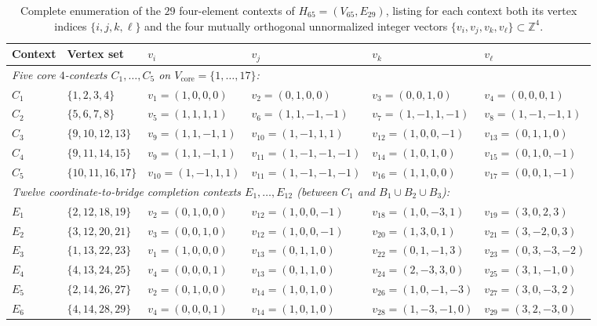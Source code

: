 \documentclass[
  aps,
  pra,
  reprint,
  superscriptaddress,
  amsmath,
  amssymb,
  nofootinbib,
  floatfix
]{revtex4-2}
\theoremstyle{definition}
\theoremstyle{remark}
\begin{document}
\begin{table}[t]
\caption{Complete enumeration of the $29$ four-element contexts of $H_{65}=(V_{65},E_{29})$, listing for each context both its vertex indices $\{i,j,k,\ell\}$ and the four mutually orthogonal unnormalized integer vectors $\{v_i,v_j,v_k,v_\ell\}\subset\mathbb{Z}^4$.}\label{tab:app-h65-contexts}
\scriptsize
\begin{ruledtabular}
\begin{tabular}{llllll}
Context & Vertex set & $v_i$ & $v_j$ & $v_k$ & $v_\ell$ \\ \hline
\multicolumn{6}{l}{\emph{Five core $4$-contexts $C_1,\ldots,C_5$ on $V_{\mathrm{core}}=\{1,\ldots,17\}$:}} \\
$C_1$ & $\{1,2,3,4\}$     & $v_1=(1,0,0,0)$   & $v_2=(0,1,0,0)$    & $v_3=(0,0,1,0)$     & $v_4=(0,0,0,1)$ \\
$C_2$ & $\{5,6,7,8\}$     & $v_5=(1,1,1,1)$   & $v_6=(1,1,-1,-1)$  & $v_7=(1,-1,1,-1)$   & $v_8=(1,-1,-1,1)$ \\
$C_3$ & $\{9,10,12,13\}$  & $v_9=(1,1,-1,1)$  & $v_{10}=(1,-1,1,1)$& $v_{12}=(1,0,0,-1)$ & $v_{13}=(0,1,1,0)$ \\
$C_4$ & $\{9,11,14,15\}$  & $v_9=(1,1,-1,1)$  & $v_{11}=(1,-1,-1,-1)$ & $v_{14}=(1,0,1,0)$ & $v_{15}=(0,1,0,-1)$ \\
$C_5$ & $\{10,11,16,17\}$ & $v_{10}=(1,-1,1,1)$ & $v_{11}=(1,-1,-1,-1)$ & $v_{16}=(1,1,0,0)$ & $v_{17}=(0,0,1,-1)$ \\ \hline
\multicolumn{6}{l}{\emph{Twelve coordinate-to-bridge completion contexts $E_1,\ldots,E_{12}$ (between $C_1$ and $B_1\cup B_2\cup B_3$):}} \\
$E_1$  & $\{2,12,18,19\}$ & $v_2=(0,1,0,0)$ & $v_{12}=(1,0,0,-1)$ & $v_{18}=(1,0,-3,1)$  & $v_{19}=(3,0,2,3)$ \\
$E_2$  & $\{3,12,20,21\}$ & $v_3=(0,0,1,0)$ & $v_{12}=(1,0,0,-1)$ & $v_{20}=(1,3,0,1)$   & $v_{21}=(3,-2,0,3)$ \\
$E_3$  & $\{1,13,22,23\}$ & $v_1=(1,0,0,0)$ & $v_{13}=(0,1,1,0)$  & $v_{22}=(0,1,-1,3)$  & $v_{23}=(0,3,-3,-2)$ \\
$E_4$  & $\{4,13,24,25\}$ & $v_4=(0,0,0,1)$ & $v_{13}=(0,1,1,0)$  & $v_{24}=(2,-3,3,0)$  & $v_{25}=(3,1,-1,0)$ \\
$E_5$  & $\{2,14,26,27\}$ & $v_2=(0,1,0,0)$ & $v_{14}=(1,0,1,0)$  & $v_{26}=(1,0,-1,-3)$ & $v_{27}=(3,0,-3,2)$ \\
$E_6$  & $\{4,14,28,29\}$ & $v_4=(0,0,0,1)$ & $v_{14}=(1,0,1,0)$  & $v_{28}=(1,-3,-1,0)$ & $v_{29}=(3,2,-3,0)$ \\

\end{tabular}
\end{ruledtabular}
\end{table}
\end{document}
